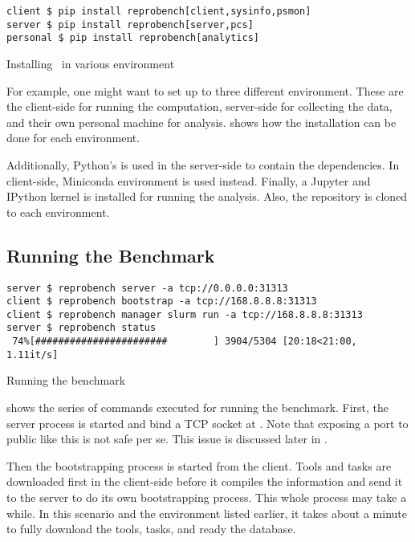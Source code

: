 \begin{listing}
    \begin{verbatim}
client $ pip install reprobench[client,sysinfo,psmon]
server $ pip install reprobench[server,pcs]
personal $ pip install reprobench[analytics]
    \end{verbatim}
    \caption{Installing \OurBenchmarkingTool~in various environment}
    \label{lst:eval.install}
\end{listing}

For example, one might want to set up to three different environment.
These are the client-side for running the computation, server-side for collecting the data, and their own personal machine for analysis.
 shows how the installation can be done for each environment.

Additionally, Python's  is used in the server-side to contain the dependencies.
In client-side, Miniconda environment is used instead.
Finally, a Jupyter and IPython kernel is installed for running the analysis.
Also, the repository is cloned to each environment.

\subsection{Running the Benchmark}

\begin{listing}
    \begin{verbatim}
server $ reprobench server -a tcp://0.0.0.0:31313
client $ reprobench bootstrap -a tcp://168.8.8.8:31313
client $ reprobench manager slurm run -a tcp://168.8.8.8:31313
server $ reprobench status
 74%[#######################        ] 3904/5304 [20:18<21:00,  1.11it/s]
    \end{verbatim}
    \caption{Running the benchmark}
    \label{lst:eval.running}
\end{listing}

 shows the series of commands executed for running the benchmark.
First, the server process is started and bind a TCP socket at .
Note that exposing a port to public like this is not safe per se.
This issue is discussed later in .

Then the bootstrapping process is started from the client.
Tools and tasks are downloaded first in the client-side before it compiles the information and send it to the server to do its own bootstrapping process.
This whole process may take a while.
In this scenario and the environment listed earlier, it takes about a minute to fully download the tools, tasks, and ready the database.

